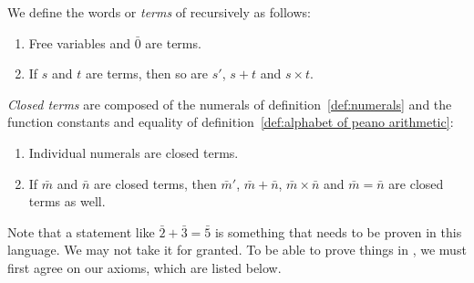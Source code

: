 \begin{definition}[Terms of \PA{}]\label{def:terms of peano arithmetic}
    We define the words or \emph{terms} of \PA{} recursively as follows:
    \begin{enumerate}
        \item
            Free variables and \(\bar0\) are terms.
        \item
            If \(s\) and \(t\) are terms, then so are \(s'\),
            \(s+t\) and \(s\times t\).
    \end{enumerate}
\end{definition}
\begin{definition}\label{def:closed terms of peano arithmetic}
    \emph{Closed terms} are composed of the numerals of definition~\ref{def:numerals}
    and the function constants and equality of definition~\ref{def:alphabet of peano arithmetic}:
    \begin{enumerate}
        \item
            Individual numerals are closed terms.
        \item
            If \(\bar m\) and \(\bar n\) are closed terms,
            then \(\bar m '\), \(\bar m +\bar n\), \(\bar m\times\bar n\)
            and \(\bar m = \bar n\) are closed terms as well.
    \end{enumerate}
\end{definition}

Note that a statement like \(\bar2+\bar3=\bar5\) is something that needs to be
proven in this language. We may not take it for granted. To be able to prove
things in \PA{}, we must first agree on our axioms, which are listed below.

